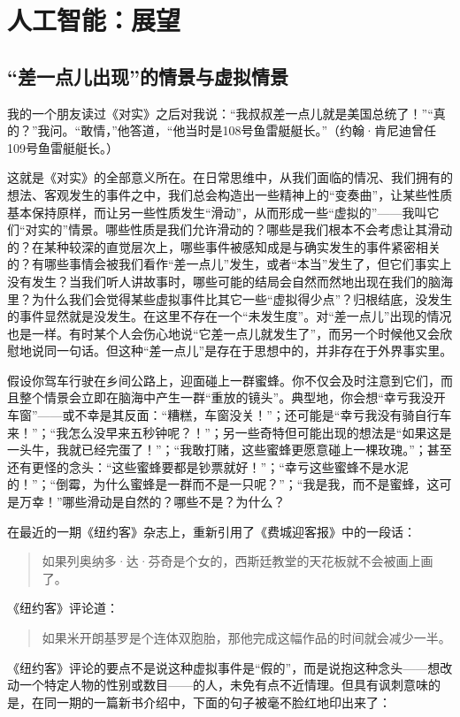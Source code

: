 
\chapter{人工智能：展望}

\section{“差一点儿出现”的情景与虚拟情景}

我的一个朋友读过《对实》之后对我说：“我叔叔差一点儿就是美国总统了！”“真的？”我问。“敢情，”他答道，“他当时是108号鱼雷艇艇长。”（约翰·肯尼迪曾任109号鱼雷艇艇长。）

这就是《对实》的全部意义所在。在日常思维中，从我们面临的情况、我们拥有的想法、客观发生的事件之中，我们总会构造出一些精神上的“变奏曲”，让某些性质基本保持原样，而让另一些性质发生“滑动”，从而形成一些“虚拟的”——我叫它们“对实的”情景。哪些性质是我们允许滑动的？哪些是我们根本不会考虑让其滑动的？在某种较深的直觉层次上，哪些事件被感知成是与确实发生的事件紧密相关的？有哪些事情会被我们看作“差一点儿”发生，或者“本当”发生了，但它们事实上没有发生？当我们听人讲故事时，哪些可能的结局会自然而然地出现在我们的脑海里？为什么我们会觉得某些虚拟事件比其它一些“虚拟得少点”？归根结底，没发生的事件显然就是没发生。在这里不存在一个“未发生度”。对“差一点儿”出现的情况也是一样。有时某个人会伤心地说“它差一点儿就发生了”，而另一个时候他又会欣慰地说同一句话。但这种“差一点儿”是存在于思想中的，并非存在于外界事实里。

假设你驾车行驶在乡间公路上，迎面碰上一群蜜蜂。你不仅会及时注意到它们，而且整个情景会立即在脑海中产生一群“重放的镜头”。典型地，你会想“幸亏我没开车窗”——或不幸是其反面：“糟糕，车窗没关！”；还可能是“幸亏我没有骑自行车来！”；“我怎么没早来五秒钟呢？！”；另一些奇特但可能出现的想法是“如果这是一头牛，我就已经完蛋了！”；“我敢打赌，这些蜜蜂更愿意碰上一棵玫瑰。”；甚至还有更怪的念头：“这些蜜蜂要都是钞票就好！”；“幸亏这些蜜蜂不是水泥的！”；“倒霉，为什么蜜蜂是一群而不是一只呢？”；“我是我，而不是蜜蜂，这可是万幸！”哪些滑动是自然的？哪些不是？为什么？

在最近的一期《纽约客》杂志上，重新引用了《费城迎客报》中的一段话：

\begin{quote}
如果列奥纳多·达·芬奇是个女的，西斯廷教堂的天花板就不会被画上画了。
\end{quote}
《纽约客》评论道：

\begin{quote}
如果米开朗基罗是个连体双胞胎，那他完成这幅作品的时间就会减少一半。
\end{quote}
《纽约客》评论的要点不是说这种虚拟事件是“假的”，而是说抱这种念头——想改动一个特定人物的性别或数目——的人，未免有点不近情理。但具有讽刺意味的是，在同一期的一篇新书介绍中，下面的句子被毫不脸红地印出来了：


